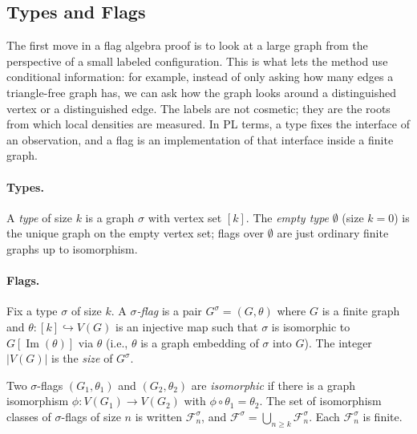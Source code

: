 \documentclass{article}
\begin{document}
\subsection{Types and Flags}

The first move in a flag algebra proof is to look at a large graph from the
perspective of a small labeled configuration.  This is what lets the method use
conditional information: for example, instead of only asking how many edges a
triangle-free graph has, we can ask how the graph looks around a distinguished
vertex or a distinguished edge.  The labels are not cosmetic; they are the
roots from which local densities are measured.  In PL terms, a type fixes the
interface of an observation, and a flag is an implementation of that interface
inside a finite graph.

\paragraph{Types.}
A \emph{type} of size $k$ is a graph $\sigma$ with vertex set $[k]$.
The \emph{empty type} $\emptyset$ (size $k=0$) is the unique graph on the
empty vertex set; flags over $\emptyset$ are just ordinary finite graphs
up to isomorphism.

\paragraph{Flags.}
Fix a type $\sigma$ of size $k$.
A \emph{$\sigma$-flag} is a pair $G^\sigma = (G, \theta)$ where $G$ is a
finite graph and $\theta : [k] \hookrightarrow V(G)$ is an injective map such
that $\sigma$ is isomorphic to $G[\operatorname{Im}(\theta)]$ via $\theta$ 
(i.e., $\theta$ is a graph embedding of $\sigma$ into $G$).
The integer $|V(G)|$ is the \emph{size} of $G^\sigma$.

Two $\sigma$-flags $(G_1,\theta_1)$ and $(G_2,\theta_2)$ are
\emph{isomorphic} if there is a graph isomorphism $\phi: V(G_1)\to V(G_2)$
with $\phi \circ \theta_1 = \theta_2$.  The set of isomorphism classes of
$\sigma$-flags of size $n$ is written $\mathcal{F}^\sigma_n$, and
$\mathcal{F}^\sigma = \bigcup_{n \geq k} \mathcal{F}^\sigma_n$.
Each $\mathcal{F}^\sigma_n$ is finite.
\end{document}
